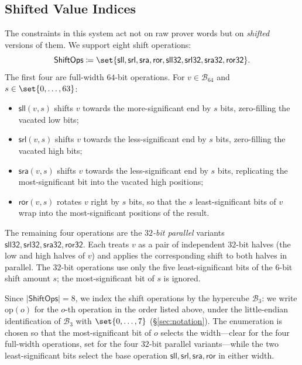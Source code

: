 \documentclass{article}
\theoremstyle{definition}
\newcommand{\BB}{\mathcal{B}}
\begin{document}
\subsection{Shifted Value Indices}
\label{sec:shifted-indices}

The constraints in this system act not on raw prover words but on \emph{shifted} versions of them. We support eight shift operations:
\[
  \textsf{ShiftOps} \coloneqq \set{\textsf{sll}, \textsf{srl}, \textsf{sra}, \textsf{ror}, \textsf{sll32}, \textsf{srl32}, \textsf{sra32}, \textsf{ror32}}.
\]
The first four are full-width $64$-bit operations. For $v \in \BB_{64}$ and $s \in \set{0, \ldots, 63}$:
\begin{itemize}
\item $\textsf{sll}(v, s)$ shifts $v$ towards the more-significant end by $s$ bits, zero-filling the vacated low bits;
\item $\textsf{srl}(v, s)$ shifts $v$ towards the less-significant end by $s$ bits, zero-filling the vacated high bits;
\item $\textsf{sra}(v, s)$ shifts $v$ towards the less-significant end by $s$ bits, replicating the most-significant bit into the vacated high positions;
\item $\textsf{ror}(v, s)$ rotates $v$ right by $s$ bits, so that the $s$ least-significant bits of $v$ wrap into the most-significant positions of the result.
\end{itemize}
The remaining four operations are the \emph{$32$-bit parallel} variants $\textsf{sll32}, \textsf{srl32}, \textsf{sra32}, \textsf{ror32}$. Each treats $v$ as a pair of independent $32$-bit halves (the low and high halves of $v$) and applies the corresponding shift to both halves in parallel. The $32$-bit operations use only the five least-significant bits of the $6$-bit shift amount $s$; the most-significant bit of $s$ is ignored.

Since $|\textsf{ShiftOps}| = 8$, we index the shift operations by the hypercube $\BB_3$: we write $\text{op}(o)$ for the $o$-th operation in the order listed above, under the little-endian identification of $\BB_3$ with $\set{0, \ldots, 7}$ (\S\ref{sec:notation}). The enumeration is chosen so that the most-significant bit of $o$ selects the width---clear for the four full-width operations, set for the four $32$-bit parallel variants---while the two least-significant bits select the base operation $\textsf{sll}, \textsf{srl}, \textsf{sra}, \textsf{ror}$ in either width.
\end{document}
